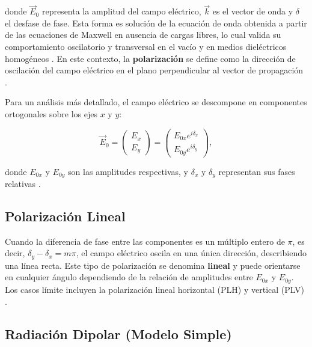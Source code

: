 \documentclass[article,12pt]{elsarticle}
\begin{document}
donde \(\vec{E}_0\) representa la amplitud del campo eléctrico, \(\vec{k}\) es el vector de onda y \(\delta\) el desfase de fase. Esta forma es solución de la ecuación de onda obtenida a partir de las ecuaciones de Maxwell en ausencia de cargas libres, lo cual valida su comportamiento oscilatorio y transversal en el vacío y en medios dieléctricos homogéneos \cite{griffiths1999, hecht2000}. En este contexto, la \textbf{polarización} se define como la dirección de oscilación del campo eléctrico en el plano perpendicular al vector de propagación \cite{pedrotti2018, Polarizacion}.

Para un análisis más detallado, el campo eléctrico se descompone en componentes ortogonales sobre los ejes \(x\) y \(y\):

\begin{mdframed}
\begin{equation}
    \vec{E}_0 = \begin{pmatrix} E_x \\ E_y \end{pmatrix} = \begin{pmatrix} E_{0x} e^{i\delta_x} \\ E_{0y} e^{i\delta_y} \end{pmatrix},
\end{equation}
\end{mdframed}

donde \(E_{0x}\) y \(E_{0y}\) son las amplitudes respectivas, y \(\delta_x\) y \(\delta_y\) representan sus fases relativas \cite{hecht2000, Polarizacion}.

\subsection{Polarización Lineal}

Cuando la diferencia de fase entre las componentes es un múltiplo entero de \(\pi\), es decir, \(\delta_y - \delta_x = m\pi\), el campo eléctrico oscila en una única dirección, describiendo una línea recta. Este tipo de polarización se denomina \textbf{lineal} y puede orientarse en cualquier ángulo dependiendo de la relación de amplitudes entre \(E_{0x}\) y \(E_{0y}\). Los casos límite incluyen la polarización lineal horizontal (PLH) y vertical (PLV) \cite{pedrotti2018, Polarizacion}.

\subsection{Radiación Dipolar (Modelo Simple)}
\end{document}
